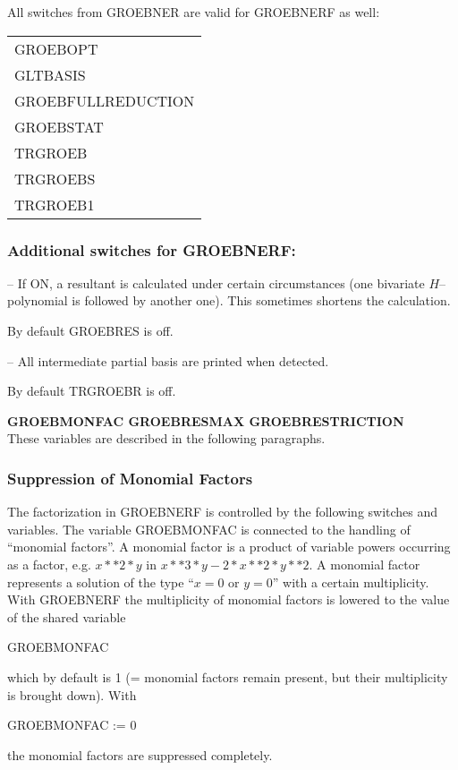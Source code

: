 All switches from GROEBNER are valid for GROEBNERF as well:
  
  
 
\begin{center}
\begin{tabular}{l}
GROEBOPT \\
GLTBASIS \\
GROEBFULLREDUCTION \\
GROEBSTAT \\
TRGROEB \\
TRGROEBS \\
TRGROEB1
\end{tabular}
\end{center}

\subsubsection*{Additional switches for GROEBNERF:}
\begin{description}
\item[GROEBRES] -- If ON, a resultant is calculated under certain
circumstances (one bivariate $H$--polynomial is followed by another
one). This sometimes shortens the calculation.

By default GROEBRES is off.

\item[TRGROEBR] -- All intermediate partial basis are printed when
detected.

By default TRGROEBR is off.
\end{description}
{\bf GROEBMONFAC  GROEBRESMAX  GROEBRESTRICTION} \\
\hspace*{.5cm} These variables are described in the following
paragraphs.

\subsubsection{Suppression of Monomial Factors}
The factorization in GROEBNERF is controlled by the following
switches and variables.  The variable GROEBMONFAC is connected to
the handling of ``monomial factors''.  A monomial factor is a product
of variable powers occurring as a factor, e.g. $ x**2*y$  in  $x**3*y -
2*x**2*y**2$.  A monomial factor represents a solution of the type
``$ x = 0$  or  $y = 0$'' with a certain multiplicity.  With
GROEB\-NERF 
the multiplicity of monomial factors is lowered to the value of the
shared variable
\begin{center}
GROEBMONFAC
\end{center}
which by default is 1 (= monomial factors remain present, but their
multiplicity is brought down). With
\begin{center}
GROEBMONFAC := 0
\end{center}
the monomial factors are suppressed completely.


